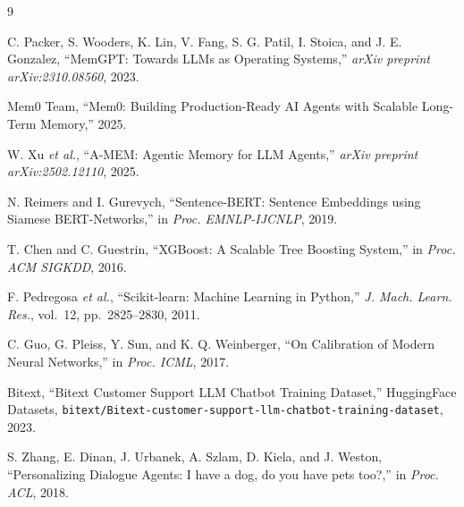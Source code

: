 \documentclass[conference]{IEEEtran}
\begin{document}

\begin{thebibliography}{9}

C. Packer, S. Wooders, K. Lin, V. Fang, S. G. Patil,
I. Stoica, and J. E. Gonzalez,
``MemGPT: Towards LLMs as Operating Systems,''
\emph{arXiv preprint arXiv:2310.08560}, 2023.

Mem0 Team,
``Mem0: Building Production-Ready AI Agents with
Scalable Long-Term Memory,''
2025.

W. Xu \emph{et al.},
``A-MEM: Agentic Memory for LLM Agents,''
\emph{arXiv preprint arXiv:2502.12110}, 2025.

N. Reimers and I. Gurevych,
``Sentence-BERT: Sentence Embeddings using Siamese
BERT-Networks,''
in \emph{Proc. EMNLP-IJCNLP}, 2019.

T. Chen and C. Guestrin,
``XGBoost: A Scalable Tree Boosting System,''
in \emph{Proc. ACM SIGKDD}, 2016.

F. Pedregosa \emph{et al.},
``Scikit-learn: Machine Learning in Python,''
\emph{J. Mach. Learn. Res.}, vol.~12, pp.~2825--2830,
2011.

C. Guo, G. Pleiss, Y. Sun, and K. Q. Weinberger,
``On Calibration of Modern Neural Networks,''
in \emph{Proc. ICML}, 2017.

Bitext,
``Bitext Customer Support LLM Chatbot Training Dataset,''
HuggingFace Datasets,
\texttt{bitext/Bitext-customer-support-llm-chatbot-training-dataset}, 2023.

S. Zhang, E. Dinan, J. Urbanek, A. Szlam, D. Kiela,
and J. Weston,
``Personalizing Dialogue Agents: I have a dog, do you
have pets too?,''
in \emph{Proc. ACL}, 2018.

\end{thebibliography}
\end{document}
